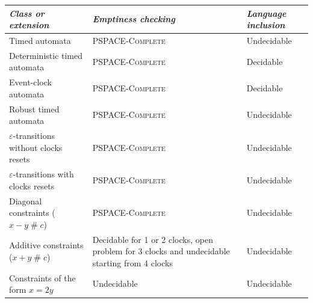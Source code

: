 
\begin{table}[htbp]
\centering
\footnotesize
\begin{tabular}{|p{5cm}|p{4.5cm}|p{2.5cm}|}

	\hline
	
	\textit{Class or extension} &
	\textit{Emptiness checking} &
	\textit{Language inclusion} \\
	
	\hline \hline
	
	  Timed automata &
    \textsc{PSPACE-Complete} &
    Undecidable \\

    \hline

    Deterministic timed automata &
    \textsc{PSPACE-Complete} &
    Decidable \\

    \hline

    Event-clock automata &
    \textsc{PSPACE-Complete} &
    Decidable \\

    \hline

    Robust timed automata &
    \textsc{PSPACE-Complete} &
    Undecidable \\

    \hline \hline

    $\varepsilon$-transitions without clocks resets &
    \textsc{PSPACE-Complete} &
    Undecidable \\

    \hline

    $\varepsilon$-transitions with clocks resets &
    \textsc{PSPACE-Complete} &
    Undecidable \\

    \hline

    Diagonal constraints ($x - y \;\#\; c$)&
    \textsc{PSPACE-Complete} &
    Undecidable \\

    \hline

    Additive constraints ($x + y \;\#\; c$) &
    Decidable for 1 or 2 clocks, open problem for 3 clocks and undecidable starting from 4 clocks \cite{BerDuf-IPL2000} &
    Undecidable \\

    \hline
    
    Constraints of the form $x = 2y$ &
    Undecidable \cite{RADLD94} &
    Undecidable \\
    

\end{tabular}
\end{table}
